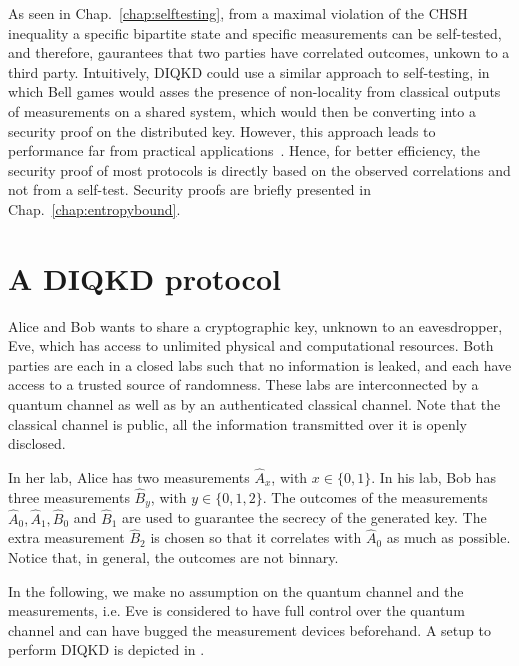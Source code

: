 As seen in Chap.~\ref{chap:selftesting}, from a maximal violation of the CHSH inequality a specific bipartite state and specific measurements can be self-tested, and therefore, gaurantees that two parties have correlated outcomes, unkown to a third party.
Intuitively, DIQKD could use a similar approach to self-testing, in which Bell games would asses the presence of non-locality from classical outputs of measurements on a shared system, which would then be converting into a security proof on the distributed key.
However, this approach leads to performance far from practical applications~\cite{Fu2018,Kundu2022}.
Hence, for better efficiency, the security proof of most protocols is directly based on the observed correlations and not from a self-test.
Security proofs are briefly presented in Chap.~\ref{chap:entropybound}.


\section{A DIQKD protocol}

Alice and Bob wants to share a cryptographic key, unknown to an eavesdropper, Eve, which has access to unlimited physical and computational resources.
Both parties are each in a closed labs such that no information is leaked, and each have access to a trusted source of randomness.
These labs are interconnected by a quantum channel as well as by an authenticated classical channel.
Note that the classical channel is public, all the information transmitted over it is openly disclosed.

In her lab, Alice has two measurements $\hat{A}_x$, with $x\in \{0,1\}$.
In his lab, Bob has three measurements $\hat{B}_y$, with $y \in \{0,1,2\}$.
The outcomes of the measurements $\hat{A}_0,\hat{A}_1,\hat{B}_0$ and $\hat{B}_1$ are used to guarantee the secrecy of the generated key.
The extra measurement $\hat{B}_2$ is chosen so that it correlates with $\hat{A}_0$ as much as possible.
Notice that, in general, the outcomes are not binnary.

In the following, we make no assumption on the quantum channel and the measurements, i.e. Eve is considered to have full control over the quantum channel and can have bugged the measurement devices beforehand.
A setup to perform DIQKD is depicted in .

\medbreak

